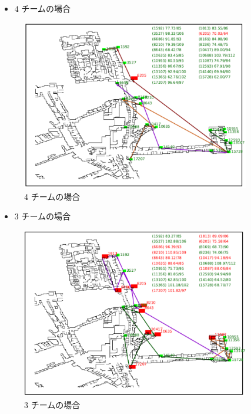 \documentclass[a4paper,12pt,fleqn]{jarticle}
\begin{document}
\begin{itemize}
\begin{itemize}
\item $4$ チームの場合
\end{itemize}

\begin{figure}[H]
\begin{center}
  \includegraphics[width=10cm,clip]{st57_t4_no30.pdf}
  \caption{4 チームの場合}
  \label{fig:st57_t4_no30}
  \end{center}
\end{figure}

\begin{itemize}
\item $3$ チームの場合
\end{itemize}

\begin{figure}[H]
\begin{center}
  \includegraphics[width=10cm,clip]{st57_t3_no30.pdf}
  \caption{3 チームの場合}
  \label{fig:st57_t3_no30}
  \end{center}
\end{figure}




\end{itemize}
\end{document}
